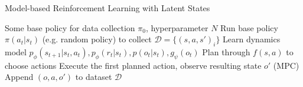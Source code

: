\begin{algorithm}[t!]
\caption{Model-based Reinforcement Learning with Latent States}
\begin{algorithmic}[1]
\label{alg:mblatent}
\REQUIRE Some base policy for data collection $\pi_0$, hyperparameter $N$
\STATE Run base policy $\pi(a_t|s_t)$ (e.g. random policy) to collect $\mathcal{D} = \{(s,a,s')_i\}$
\STATE Learn dynamics model $p_\phi(s_{t+1}|s_t,a_t),p_\phi(r_t|s_t),p(o_t|s_t),g_\psi(o_t)$
\STATE Plan through $f(s,a)$ to choose actions
\STATE Execute the first planned action, observe resulting state $o'$ (MPC)
\STATE Append $(o,a,o')$ to dataset $\mathcal{D}$
\ENDWHILE
\ENDFOR
\end{algorithmic}
\end{algorithm}